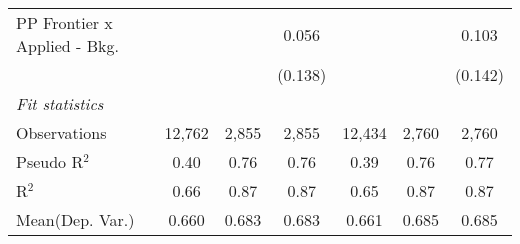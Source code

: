 \begin{tabular}{lcccccc}
   PP Frontier x Applied - Bkg.   &                &              & 0.056         &                &              & 0.103\\   
                                  &                &              & (0.138)       &                &              & (0.142)\\   
   \midrule
   \emph{Fit statistics}\\
   Observations                   & 12,762         & 2,855        & 2,855         & 12,434         & 2,760        & 2,760\\  
   Pseudo R$^2$                   & 0.40           & 0.76         & 0.76          & 0.39           & 0.76         & 0.77\\  
   R$^2$                          & 0.66           & 0.87         & 0.87          & 0.65           & 0.87         & 0.87\\  
Mean(Dep. Var.) & 0.660 & 0.683 & 0.683 & 0.661 & 0.685 & 0.685 \\
   

\end{tabular}
